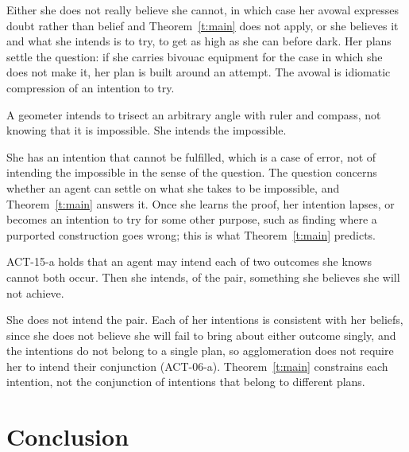 \documentclass{situationist-preprint}
\begin{document}
\begin{reply}
Either she does not really believe she cannot, in which case her avowal expresses doubt rather than belief and Theorem~\ref{t:main} does not apply, or she believes it and what she intends is to try, to get as high as she can before dark. Her plans settle the question: if she carries bivouac equipment for the case in which she does not make it, her plan is built around an attempt. The avowal is idiomatic compression of an intention to try.
\end{reply}

\begin{objection}
A geometer intends to trisect an arbitrary angle with ruler and compass, not knowing that it is impossible. She intends the impossible.
\end{objection}

\begin{reply}
She has an intention that cannot be fulfilled, which is a case of error, not of intending the impossible in the sense of the question. The question concerns whether an agent can settle on what she takes to be impossible, and Theorem~\ref{t:main} answers it. Once she learns the proof, her intention lapses, or becomes an intention to try for some other purpose, such as finding where a purported construction goes wrong; this is what Theorem~\ref{t:main} predicts.
\end{reply}

\begin{objection}
ACT-15-a holds that an agent may intend each of two outcomes she knows cannot both occur. Then she intends, of the pair, something she believes she will not achieve.
\end{objection}

\begin{reply}
She does not intend the pair. Each of her intentions is consistent with her beliefs, since she does not believe she will fail to bring about either outcome singly, and the intentions do not belong to a single plan, so agglomeration does not require her to intend their conjunction (ACT-06-a). Theorem~\ref{t:main} constrains each intention, not the conjunction of intentions that belong to different plans.
\end{reply}

\section{Conclusion}
\end{document}
